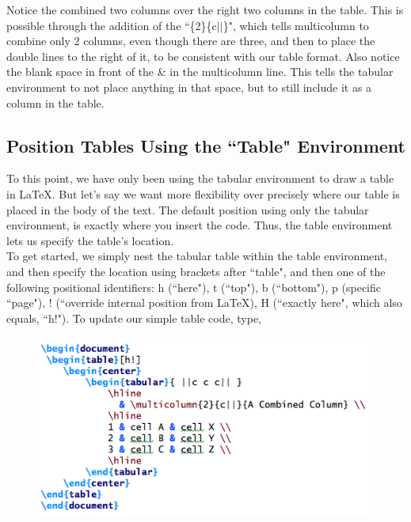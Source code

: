 \documentclass[11pt]{article}
\newcommand{\forceindent}{\leavevmode{\parindent=1.5em\indent}} %
\begin{document}
Notice the combined two columns over the right two columns in the table. This is possible through the addition of the ``\{2\}\{c$|$$|$\}", which tells multicolumn to combine only 2 columns, even though there are three, and then to place the double lines to the right of it, to be consistent with our table format. Also notice the blank space in front of the \& in the multicolumn line. This tells the tabular environment to not place anything in  that space, but to still include it as a column in the table.


\subsection{Position Tables Using the ``Table" Environment}

\forceindent To this point, we have only been using the tabular environment to draw a table in \LaTeX. But let's say we want more flexibility over precisely where our table is placed in the body of the text. The default position using only the tabular environment, is exactly where you insert the code. Thus, the table environment lets us specify the table's location. \\

To get started, we simply nest the tabular table within the table environment, and then specify the location using brackets after ``table", and then one of the following positional identifiers: h (``here"), t (``top"), b (``bottom"), p (specific ``page"), ! (``override internal position from \LaTeX), H (``exactly here", which also equals, ``h!"). To update our simple table code, type,

\begin{figure}[!h]
	\includegraphics[scale=.5]{CODE5} \\ %
\end{figure}
\end{document}
